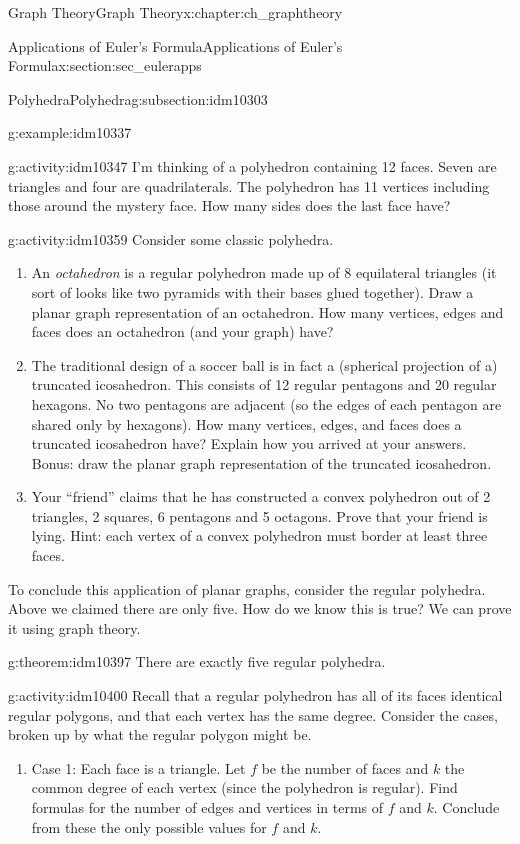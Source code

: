 \documentclass[oneside,10pt,]{book}
\numberwithin{equation}{chapter}
\begin{document}
\begin{chapterptx}{Graph Theory}{}{Graph Theory}{}{}{x:chapter:ch_graphtheory}
\begin{sectionptx}{Applications of Euler's Formula}{}{Applications of Euler's Formula}{}{}{x:section:sec_eulerapps}
\begin{subsectionptx}{Polyhedra}{}{Polyhedra}{}{}{g:subsection:idm10303}
\begin{example}{}{g:example:idm10337}
\end{example}
\begin{activity}{}{g:activity:idm10347}%
I'm thinking of a polyhedron containing 12 faces. Seven are triangles and four are quadrilaterals. The polyhedron has 11 vertices including those around the mystery face. How many sides does the last face have?%
\end{activity}
\begin{activity}{}{g:activity:idm10359}%
Consider some classic polyhedra.%
\begin{enumerate}[font=\bfseries,label=(\alph*),ref=\alph*]
\item{}An \emph{octahedron} is a regular polyhedron made up of 8 equilateral triangles (it sort of looks like two pyramids with their bases glued together). Draw a planar graph representation of an octahedron. How many vertices, edges and faces does an octahedron (and your graph) have?%
\item{}The traditional design of a soccer ball is in fact a (spherical projection of a) truncated icosahedron. This consists of 12 regular pentagons and 20 regular hexagons. No two pentagons are adjacent (so the edges of each pentagon are shared only by hexagons). How many vertices, edges, and faces does a truncated icosahedron have? Explain how you arrived at your answers. Bonus: draw the planar graph representation of the truncated icosahedron.%
\item{}Your ``friend'' claims that he has constructed a convex polyhedron out of 2 triangles, 2 squares, 6 pentagons and 5 octagons. Prove that your friend is lying. Hint: each vertex of a convex polyhedron must border at least three faces.%
\end{enumerate}
\end{activity}
To conclude this application of planar graphs, consider the regular polyhedra. Above we claimed there are only five. How do we know this is true? We can prove it using graph theory.%
\begin{theorem}{}{}{g:theorem:idm10397}%
There are exactly five regular polyhedra.%
\end{theorem}
\begin{activity}{}{g:activity:idm10400}%
Recall that a regular polyhedron has all of its faces identical regular polygons, and that each vertex has the same degree. Consider the cases, broken up by what the regular polygon might be.%
\begin{enumerate}[font=\bfseries,label=(\alph*),ref=\alph*]
\item{}Case 1: Each face is a triangle.  Let \(f\) be the number of faces and \(k\) the common degree of each vertex (since the polyhedron is regular).  Find formulas for the number of edges and vertices in terms of \(f\) and \(k\).  Conclude from these the only possible values for \(f\) and \(k\).%

\end{enumerate}
\end{activity}
\end{subsectionptx}
\end{sectionptx}
\end{chapterptx}
\end{document}
